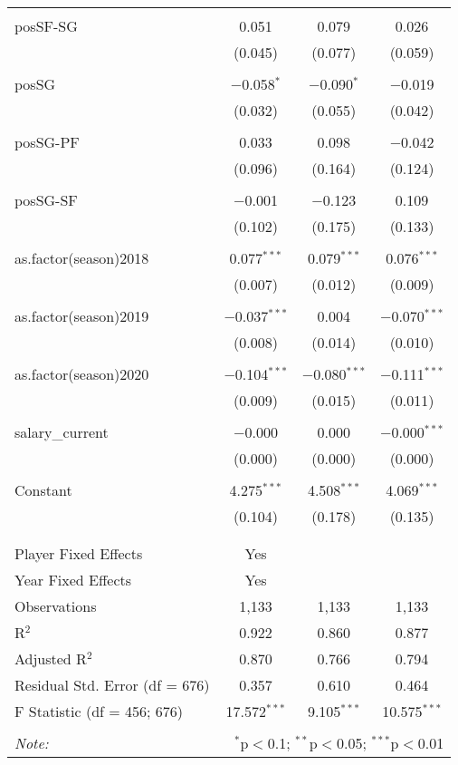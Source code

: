 \documentclass[a4paper,11pt]{article}
\begin{document}
\begin{table}[!htbp]
{\begin{tabular}{@{\extracolsep{5pt}}lccc}
  & & & \\ 
 posSF-SG & 0.051 & 0.079 & 0.026 \\ 
  & (0.045) & (0.077) & (0.059) \\ 
  & & & \\ 
 posSG & $-$0.058$^{*}$ & $-$0.090$^{*}$ & $-$0.019 \\ 
  & (0.032) & (0.055) & (0.042) \\ 
  & & & \\ 
 posSG-PF & 0.033 & 0.098 & $-$0.042 \\ 
  & (0.096) & (0.164) & (0.124) \\ 
  & & & \\ 
 posSG-SF & $-$0.001 & $-$0.123 & 0.109 \\ 
  & (0.102) & (0.175) & (0.133) \\ 
  & & & \\ 
 as.factor(season)2018 & 0.077$^{***}$ & 0.079$^{***}$ & 0.076$^{***}$ \\ 
  & (0.007) & (0.012) & (0.009) \\ 
  & & & \\ 
 as.factor(season)2019 & $-$0.037$^{***}$ & 0.004 & $-$0.070$^{***}$ \\ 
  & (0.008) & (0.014) & (0.010) \\ 
  & & & \\ 
 as.factor(season)2020 & $-$0.104$^{***}$ & $-$0.080$^{***}$ & $-$0.111$^{***}$ \\ 
  & (0.009) & (0.015) & (0.011) \\ 
  & & & \\ 
 salary\_current & $-$0.000 & 0.000 & $-$0.000$^{***}$ \\ 
  & (0.000) & (0.000) & (0.000) \\ 
  & & & \\ 
 Constant & 4.275$^{***}$ & 4.508$^{***}$ & 4.069$^{***}$ \\ 
  & (0.104) & (0.178) & (0.135) \\ 
  & & & \\ 
\hline \\[-1.8ex] 
Player Fixed Effects & Yes &  &  \\ 
Year Fixed Effects & Yes &  &  \\ 
Observations & 1,133 & 1,133 & 1,133 \\ 
R$^{2}$ & 0.922 & 0.860 & 0.877 \\ 
Adjusted R$^{2}$ & 0.870 & 0.766 & 0.794 \\ 
Residual Std. Error (df = 676) & 0.357 & 0.610 & 0.464 \\ 
F Statistic (df = 456; 676) & 17.572$^{***}$ & 9.105$^{***}$ & 10.575$^{***}$ \\ 
\hline 
\hline \\[-1.8ex] 
\textit{Note:}  & \multicolumn{3}{r}{$^{*}$p$<$0.1; $^{**}$p$<$0.05; $^{***}$p$<$0.01} \\ 
\end{tabular} }
\end{table}
\end{document}
